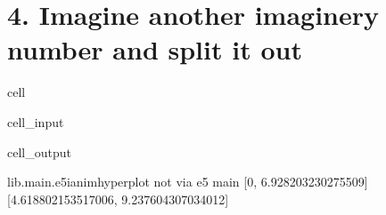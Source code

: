 \documentclass[letterpaper,10pt,english]{jupyterBook}
\begin{document}
\sphinxstepscope


\chapter{4. Imagine another imaginery number and split it out}
\label{\detokenize{MacTwgssA4-splitImgNo:imagine-another-imaginery-number-and-split-it-out}}\label{\detokenize{MacTwgssA4-splitImgNo::doc}}
\begin{sphinxuseclass}{cell}\begin{sphinxVerbatimInput}

\begin{sphinxuseclass}{cell_input}
\begin{sphinxVerbatim}[commandchars=\\\{\}]
 

\end{sphinxVerbatim}

\end{sphinxuseclass}\end{sphinxVerbatimInput}
\begin{sphinxVerbatimOutput}

\begin{sphinxuseclass}{cell_output}
\begin{sphinxVerbatim}[commandchars=\\\{\}]
lib.main.e5\PYGZus{}i\PYGZus{}anim\PYGZus{}hyperplot
not via e5 main
[0, 6.928203230275509]
[\PYGZhy{}4.618802153517006, 9.237604307034012]
\end{sphinxVerbatim}

\noindent{}

\end{sphinxuseclass}\end{sphinxVerbatimOutput}

\end{sphinxuseclass}
\end{document}
